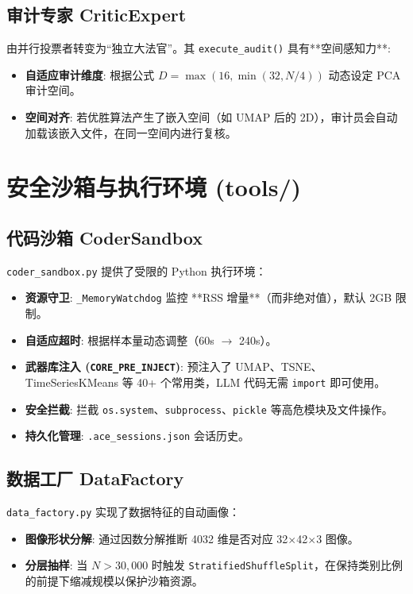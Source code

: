 \documentclass[12pt,a4paper]{article}
\begin{document}
\subsection{审计专家 CriticExpert}

由并行投票者转变为“独立大法官”。其 \texttt{execute\_audit()} 具有**空间感知力**:
\begin{itemize}
    \item \textbf{自适应审计维度}: 根据公式 $D = \max(16, \min(32, N/4))$ 动态设定 PCA 审计空间。
    \item \textbf{空间对齐}: 若优胜算法产生了嵌入空间（如 UMAP 后的 2D），审计员会自动加载该嵌入文件，在同一空间内进行复核。
\end{itemize}

\newpage

\section{安全沙箱与执行环境 (tools/)}

\subsection{代码沙箱 CoderSandbox}

\texttt{coder\_sandbox.py} 提供了受限的 Python 执行环境：
\begin{itemize}
    \item \textbf{资源守卫}: \texttt{\_MemoryWatchdog} 监控 **RSS 增量**（而非绝对值），默认 2GB 限制。
    \item \textbf{自适应超时}: 根据样本量动态调整（60s $\rightarrow$ 240s）。
    \item \textbf{武器库注入 (\texttt{CORE\_PRE\_INJECT})}: 预注入了 UMAP、TSNE、TimeSeriesKMeans 等 40+ 个常用类，LLM 代码无需 \texttt{import} 即可使用。
    \item \textbf{安全拦截}: 拦截 \texttt{os.system}、\texttt{subprocess}、\texttt{pickle} 等高危模块及文件操作。
    \item \textbf{持久化管理}: \texttt{.ace\_sessions.json} 会话历史。
\end{itemize}

\subsection{数据工厂 DataFactory}

\texttt{data\_factory.py} 实现了数据特征的自动画像：
\begin{itemize}
    \item \textbf{图像形状分解}: 通过因数分解推断 4032 维是否对应 32$\times$42$\times$3 图像。
    \item \textbf{分层抽样}: 当 $N > 30,000$ 时触发 \texttt{StratifiedShuffleSplit}，在保持类别比例的前提下缩减规模以保护沙箱资源。
\end{itemize}
\end{document}
